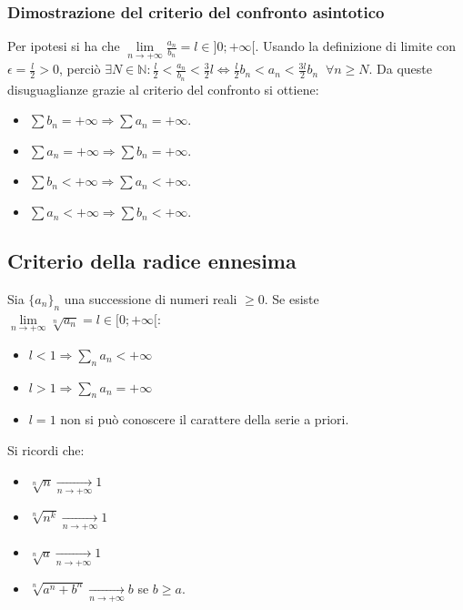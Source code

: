 \subsubsection{Dimostrazione del criterio del confronto asintotico}
Per ipotesi si ha che $\lim\limits_{n\rightarrow+\infty}\frac{a_n}{b_n}=l\in ]0;+\infty[$. Usando la definizione di limite con $\epsilon=\frac{l}{2}>0$, perci\`o $\exists N\in
\mathbb{N}:\frac{l}{2}<\frac{a_n}{b_n}<\frac{3}{2}l\Leftrightarrow\frac{l}{2}b_n<a_n<\frac{3l}{2}b_n\;\;\forall n\ge N$. Da queste disuguaglianze grazie al criterio del confronto 
si ottiene:
\begin{itemize}
\item $\sum b_n=+\infty\Rightarrow\sum a_n=+\infty$.
\item $\sum a_n=+\infty\Rightarrow\sum b_n=+\infty$.
\item $\sum b_n<+\infty\Rightarrow\sum a_n<+\infty$.
\item $\sum a_n<+\infty\Rightarrow\sum b_n<+\infty$.
\end{itemize}
\subsection{Criterio della radice ennesima}
Sia $\{a_n\}_n$ una successione di numeri reali $\ge 0$. Se esiste $\lim\limits_{n\rightarrow+\infty}\sqrt[n]{a_n}=l\in [0;+\infty[$:
\begin{itemize}
\item $l<1\Rightarrow\sum\limits_n a_n<+\infty$
\item $l>1\Rightarrow\sum\limits_n a_n=+\infty$ 
\item $l=1$ non si pu\`o conoscere il carattere della serie a priori.
\end{itemize}
Si ricordi che:
\begin{itemize}
\item $\sqrt[n]{n}\xrightarrow[n\rightarrow+\infty]{}1$
\item $\sqrt[n]{n^k}\xrightarrow[n\rightarrow+\infty]{}1$
\item $\sqrt[n]{a}\xrightarrow[n\rightarrow+\infty]{}1$
\item $\sqrt[n]{a^n+b^n}\xrightarrow[n\rightarrow+\infty]{}b$ se $b\ge a$.
\end{itemize}
